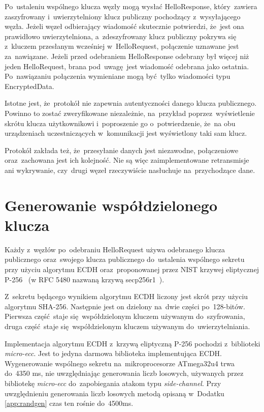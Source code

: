 Po~ustaleniu wspólnego klucza węzły mogą wysłać HelloResponse, który~zawiera zaszyfrowany i~uwierzytelniony klucz publiczny pochodzący z~wysyłającego węzła. Jeżeli węzeł odbierający wiadomość skutecznie potwierdzi, że~jest ona prawidłowo uwierzytelniona, a~zdeszyfrowany klucz publiczny pokrywa się z~kluczem przesłanym wcześniej w~HelloRequest, połączenie uznawane jest za~nawiązane. Jeżeli przed odebraniem HelloResponse odebrany był więcej niż jeden HelloRequest, brana pod~uwagę jest wiadomość odebrana jako ostatnia. Po~nawiązaniu połączenia wymieniane mogą być tylko wiadomości typu EncryptedData.

Istotne jest, że~protokół nie zapewnia autentyczności danego klucza publicznego. Powinno to zostać zweryfikowane niezależnie, na~przykład poprzez~wyświetlenie skrótu klucza użytkownikowi i~poproszenie go o~potwierdzenie, że~na obu urządzeniach uczestniczących w~komunikacji jest wyświetlony taki sam klucz.

Protokół zakłada też, że~przesyłanie danych jest niezawodne, połączeniowe oraz~zachowana jest ich kolejność. Nie są więc zaimplementowane retransmisje ani wykrywanie, czy~drugi węzeł rzeczywiście nasłuchuje na~przychodzące dane.

\section{Generowanie współdzielonego klucza}
\label{sec:sharedkey}

Każdy z~węzłów po~odebraniu HelloRequest używa odebranego klucza publicznego oraz~swojego klucza publicznego do~ustalenia wspólnego sekretu przy użyciu algorytmu ECDH oraz~proponowanej przez NIST krzywej eliptycznej P-256~\cite{kerry2013digital} (w RFC 5480 nazwaną krzywą secp256r1~\cite{turner2009elliptic}).

Z~sekretu będącego wynikiem algorytmu ECDH liczony jest skrót przy użyciu algorytmu SHA-256. Następnie jest on dzielony na~dwie części po~128-bitów. Pierwsza część staje się współdzielonym kluczem używanym do~szyfrowania, druga część staje się współdzielonym kluczem używanym do~uwierzytelniania.

Implementacja algorytmu ECDH z~krzywą eliptyczną P-256 pochodzi z~biblioteki \emph{micro-ecc}. Jest to jedyna darmowa biblioteka implementująca ECDH. Wygenerowanie wspólnego sekretu na~mikroprocesorze ATmega32u4 trwa do~4350 ms, nie uwzględniając generowania liczb losowych, używanych przez bibliotekę \emph{micro-ecc} do~zapobiegania atakom typu \emph{side-channel}. Przy uwzględnieniu generowania liczb losowych metodą opisaną w~Dodatku \ref{app:randgen} czas ten rośnie do~4500ms.

